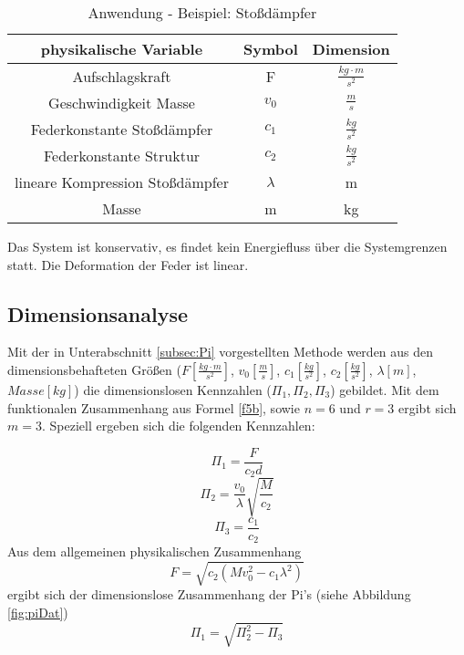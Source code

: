  
\begin{table}[h]
\centering %
\begin{tabular}{|c|c|c|} %
\hline\hline %
physikalische Variable & Symbol & Dimension  \\ 
\hline %
Aufschlagskraft & F & $\frac{kg \cdot m}{s^2}$ \\
Geschwindigkeit Masse & $v_0$ & $\frac{m}{s}$ \\
Federkonstante Stoßdämpfer & $c_1$ & $\frac{kg}{s^2}$\\
Federkonstante Struktur & $c_2$ & $\frac{kg}{s^2}$\\
lineare Kompression Stoßdämpfer & $\lambda$ & m \\
Masse & m & kg \\
\hline %
\end{tabular}
\label{tab:stoss}
\caption{Anwendung - Beispiel: Stoßdämpfer} %
\end{table}  
 

 
Das System ist konservativ, es findet kein Energiefluss über die Systemgrenzen statt. Die Deformation der Feder ist linear.

\subsection{Dimensionsanalyse}
\label{subsec:dimAnBsp}

Mit der in Unterabschnitt \ref{subsec:Pi} vorgestellten Methode werden aus den dimensionsbehafteten Größen ($F[\frac{kg\cdot m}{s^2}]$, $v_0[\frac{m}{s}]$, $c_1[\frac{kg}{s^2}]$, $c_2[\frac{kg}{s^2}]$, $\lambda[m]$, $Masse[kg]$) die dimensionslosen Kennzahlen ($\Pi_1, \Pi_2, \Pi_3$) gebildet. Mit dem funktionalen Zusammenhang aus Formel \eqref{f5b}, sowie $n = 6$ und $r = 3$ ergibt sich $m = 3$. Speziell ergeben sich die folgenden Kennzahlen:

\begin{equation}\label{f69}
\Pi_1 = \frac{F}{c_2 d}
\end{equation}
\begin{equation}\label{f70}
\Pi_2 = \frac{v_0}{\lambda}\sqrt{\frac{M}{c_2}}
\end{equation}
\begin{equation}\label{f71}
\Pi_3 = \frac{c_1}{c_2} 
\end{equation}
Aus dem allgemeinen physikalischen Zusammenhang
\begin{equation}\label{f72}
F = \sqrt{c_2(M v_0^2-c_1 \lambda^2)}
\end{equation}
ergibt sich der dimensionslose Zusammenhang der Pi's (siehe Abbildung \ref{fig:piDat})
\begin{equation}\label{f73}
\Pi_1 = \sqrt{\Pi_2^2  - \Pi_3}
\end{equation}

